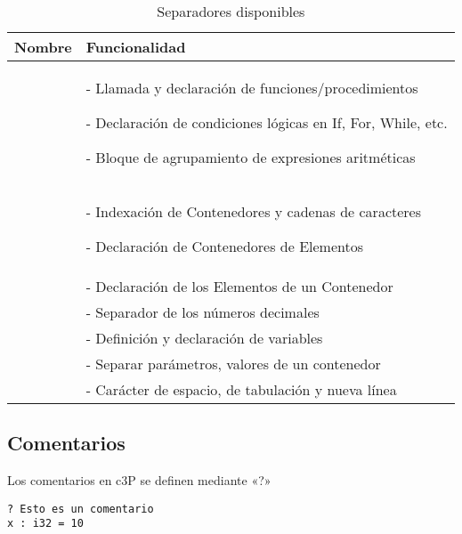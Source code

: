 \begin{table}[H]
    \centering
    \begin{tabular}{|c|p{10cm}|}
         \hline
         \textbf{Nombre} & \textbf{Funcionalidad}  \\
         \hline
         \multirow{3}{*}{\centering{( )}} &
         - Llamada y declaración de funciones/procedimientos \par
         - Declaración de condiciones lógicas en If, For, While, etc. \par
         - Bloque de agrupamiento de expresiones aritméticas \\
         \hline
         \multirow{2}{*}{\centering{[ ]}} &
         - Indexación de Contenedores y cadenas de caracteres \par
         - Declaración de Contenedores de Elementos \\
         \hline
         \multirow{1}{*}{\centering{\{ \}}}
         & - Declaración de los Elementos de un Contenedor \\
         \hline
         \multirow{1}{*}{\centering{.}}
         & - Separador de los números decimales \\
         \hline
         \multirow{1}{*}{\centering{:}}
         & - Definición y declaración de variables \\
         \hline
         \multirow{1}{*}{\centering{,}}
         & - Separar parámetros, valores de un contenedor \\
         \hline
         \multirow{1}{*}{\centering{SPACE}}
          & - Carácter de espacio, de tabulación y nueva línea \\
         \hline
    \end{tabular}
    \caption{Separadores disponibles}
    \label{tab:tab_separadores_disponibles}
\end{table}

\subsection{Comentarios}

Los comentarios en c3P se definen mediante «?»

\begin{verbatim}
? Esto es un comentario
x : i32 = 10
\end{verbatim}
